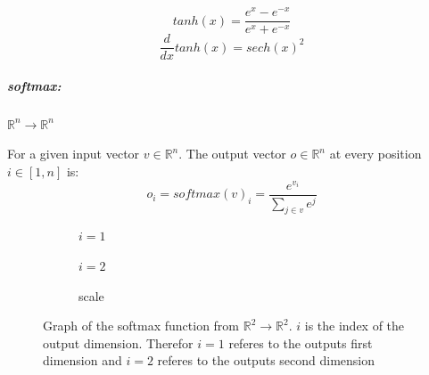 \documentclass[12pt]{article}
\begin{document}
\begin{center}

\end{center}

\begin{equation} \label{eq:NN:tanh}
tanh(x) = \frac{e^x-e^{-x}}{e^x+e^{-x}}
\end{equation}\begin{equation} \label{eq:NN:tanh_derivative}
\frac{d}{dx}tanh(x) = sech(x)^2
\end{equation}
\subparagraph{softmax:} \(\mathbb{R}^n\to \mathbb{R}^n\)
\begin{center}

\end{center}
\indent For a given input vector \(v \in \mathbb{R}^n\). The output vector \(o \in \mathbb{R}^n\) at every position \(i \in [1, n]\) is:
\begin{equation} \label{eq:NN:softmax}
o_i = softmax(v)_i = \frac{e^{v_i}}{\sum_{j \in v} e^j}
\end{equation}
\begin{figure}
\centering
\begin{subfigure}{.4\textwidth}
  \centering
  
  \caption{\(i=1\)}
  \label{fig:sub1}
\end{subfigure}%
\begin{subfigure}{.4\textwidth}
  \centering
  
  \caption{\(i=2\)}
  \label{fig:sub2}
\end{subfigure}
\begin{subfigure}{.1\textwidth}
  \centering
  
  \caption*{scale}
\end{subfigure}
\caption{Graph of the softmax function from \(\mathbb R^2 \to \mathbb R^2\). \(i\) is the index of the output dimension. Therefor \(i=1\) referes to the outputs first dimension and \(i=2\) referes to the outputs second dimension}
\label{fig:test}
\end{figure}
\end{document}
